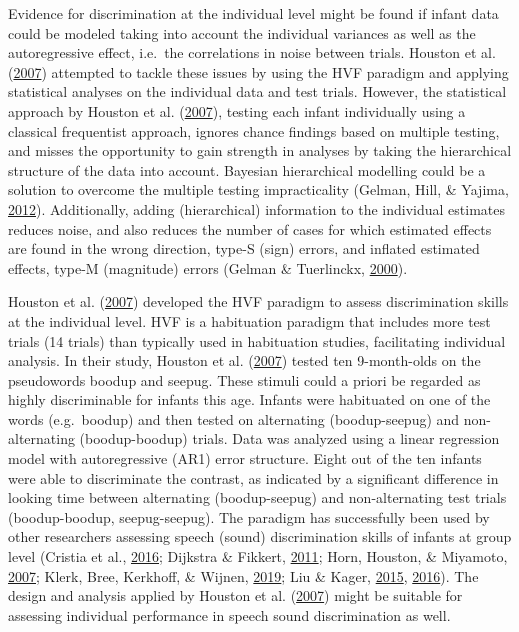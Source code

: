 \documentclass[openright,titlepage,12pt,a4paper]{book}
\begin{document}
Evidence for discrimination at the individual level might be found if infant data could be modeled taking into account the individual variances as well as the autoregressive effect, i.e.~the correlations in noise between trials. Houston et al. (\protect\hyperlink{ref-houston_assessing_2007}{2007}) attempted to tackle these issues by using the HVF paradigm and applying statistical analyses on the individual data and test trials. However, the statistical approach by Houston et al. (\protect\hyperlink{ref-houston_assessing_2007}{2007}), testing each infant individually using a classical frequentist approach, ignores chance findings based on multiple testing, and misses the opportunity to gain strength in analyses by taking the hierarchical structure of the data into account. Bayesian hierarchical modelling could be a solution to overcome the multiple testing impracticality (Gelman, Hill, \& Yajima, \protect\hyperlink{ref-gelman_why_2012}{2012}). Additionally, adding (hierarchical) information to the individual estimates reduces noise, and also reduces the number of cases for which estimated effects are found in the wrong direction, type-S (sign) errors, and inflated estimated effects, type-M (magnitude) errors (Gelman \& Tuerlinckx, \protect\hyperlink{ref-gelman_type_2000}{2000}).

Houston et al. (\protect\hyperlink{ref-houston_assessing_2007}{2007}) developed the HVF paradigm to assess discrimination skills at the individual level. HVF is a habituation paradigm that includes more test trials (14 trials) than typically used in habituation studies, facilitating individual analysis. In their study, Houston et al. (\protect\hyperlink{ref-houston_assessing_2007}{2007}) tested ten 9-month-olds on the pseudowords boodup and seepug. These stimuli could a priori be regarded as highly discriminable for infants this age. Infants were habituated on one of the words (e.g.~boodup) and then tested on alternating (boodup-seepug) and non-alternating (boodup-boodup) trials. Data was analyzed using a linear regression model with autoregressive (AR1) error structure. Eight out of the ten infants were able to discriminate the contrast, as indicated by a significant difference in looking time between alternating (boodup-seepug) and non-alternating test trials (boodup-boodup, seepug-seepug). The paradigm has successfully been used by other researchers assessing speech (sound) discrimination skills of infants at group level (Cristia et al., \protect\hyperlink{ref-cristia_test-retest_2016}{2016}; Dijkstra \& Fikkert, \protect\hyperlink{ref-dijkstra_universal_2011}{2011}; Horn, Houston, \& Miyamoto, \protect\hyperlink{ref-horn_speech_2007}{2007}; Klerk, Bree, Kerkhoff, \& Wijnen, \protect\hyperlink{ref-de_klerk_lost_2019}{2019}; Liu \& Kager, \protect\hyperlink{ref-liu_bilingual_2015}{2015}, \protect\hyperlink{ref-liu_perception_2016}{2016}). The design and analysis applied by Houston et al. (\protect\hyperlink{ref-houston_assessing_2007}{2007}) might be suitable for assessing individual performance in speech sound discrimination as well.
\end{document}
